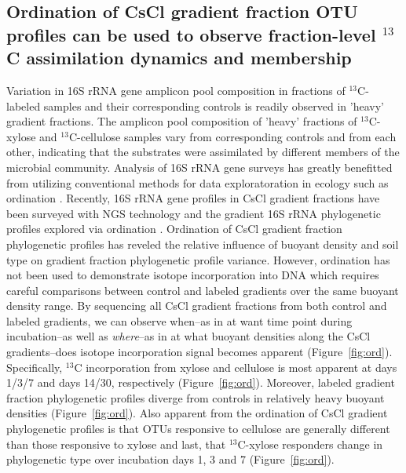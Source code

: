 \subsection{Ordination of CsCl gradient fraction OTU profiles can be used to
observe fraction-level $^{13}$C assimilation dynamics and membership}
Variation in 16S rRNA gene amplicon pool composition in fractions of
$^{13}$C-labeled samples and their corresponding controls is readily observed
in 'heavy' gradient fractions. The amplicon pool composition of 'heavy'
fractions of $^{13}$C-xylose and $^{13}$C-cellulose samples vary from
corresponding controls and from each other, indicating that the substrates were
assimilated by different members of the  microbial community.
Analysis of 16S rRNA gene surveys has greatly benefitted from utilizing
conventional methods for data exploratoration in ecology such as ordination \citep{Lozupone_2008}. 
Recently, 16S rRNA gene profiles in CsCl gradient fractions have been surveyed
with NGS technology and the gradient 16S rRNA 
phylogenetic profiles explored via ordination \citep{Angel_2013, Verastegui_2014}. Ordination of CsCl gradient fraction
phylogenetic profiles has reveled the relative influence of buoyant density and 
soil type on gradient fraction phylogenetic profile variance. However, ordination
has not been used to demonstrate isotope incorporation into DNA which requires careful
comparisons between control and labeled gradients over the same buoyant density range. By
sequencing all CsCl gradient fractions from both control and labeled gradients, we can 
observe when--as in at want time point during incubation--as well as \textit{where}--as in
at what buoyant densities along the CsCl gradients--does isotope incorporation signal 
becomes apparent (Figure~\ref{fig:ord}). Specifically, $^{13}$C incorporation from xylose
and cellulose is most apparent at days 1/3/7 and days 14/30, respectively 
(Figure~\ref{fig:ord}). Moreover, labeled gradient fraction phylogenetic profiles diverge 
from controls in relatively heavy buoyant densities (Figure~\ref{fig:ord}). Also apparent
from the ordination of CsCl gradient phylogenetic profiles is that OTUs responsive to 
cellulose are generally different than those responsive to xylose and last,
that $^{13}$C-xylose responders change in phylogenetic type over incubation
days 1, 3 and 7 (Figure~\ref{fig:ord}).

